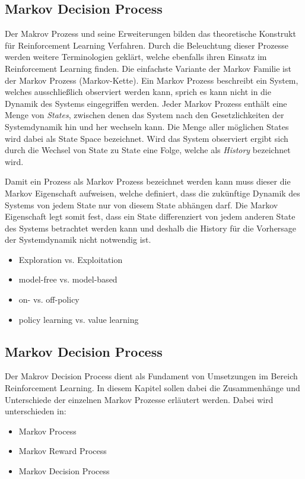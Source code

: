 \documentclass[11pt]{scrartcl}
\begin{document}
\subsection{Markov Decision Process}
Der Makrov Prozess und seine Erweiterungen bilden das theoretische Konstrukt für Reinforcement Learning
Verfahren. Durch die Beleuchtung dieser Prozesse werden weitere Terminologien geklärt, welche ebenfalls
ihren Einsatz im Reinforcement Learning finden. Die einfachste Variante der Markov Familie ist der 
Markov Prozess (Markov-Kette). Ein Markov Prozess beschreibt ein System, welches ausschließlich
observiert werden kann, sprich es kann nicht in die Dynamik des Systems eingegriffen werden. Jeder
Markov Prozess enthält eine Menge von \textit{States}, zwischen denen das System nach den
Gesetzlichkeiten der Systemdynamik hin und her wechseln kann. Die Menge aller möglichen States wird
dabei als State Space bezeichnet. Wird das System observiert ergibt sich durch die Wechsel von State zu 
State eine Folge, welche als \textit{History} bezeichnet wird. 

Damit ein Prozess als Markov Prozess bezeichnet werden kann muss dieser die Markov Eigenschaft aufweisen,
welche definiert, dass die zukünftige Dynamik des Systems von jedem State nur von diesem State abhängen 
darf. Die Markov Eigenschaft legt somit fest, dass ein State differenziert von jedem anderen State des
Systems betrachtet werden kann und deshalb die History für die Vorhersage der Systemdynamik nicht
notwendig ist.


\begin{itemize}
\itemsep0pt
\item Exploration vs. Exploitation
\item model-free vs. model-based
\item on- vs. off-policy
\item policy learning vs. value learning
\end{itemize}
\subsection{Markov Decision Process}
Der Makrov Decision Process dient als Fundament von Umsetzungen im Bereich Reinforcement Learning. In diesem Kapitel sollen dabei die Zusammenhänge und Unterschiede der einzelnen Markov Prozesse erläutert werden. Dabei wird unterschieden in:
\begin{itemize}
\itemsep0pt
\item Markov Process
\item Markov Reward Process
\item Markov Decision Process 
\end{itemize}
\end{document}
